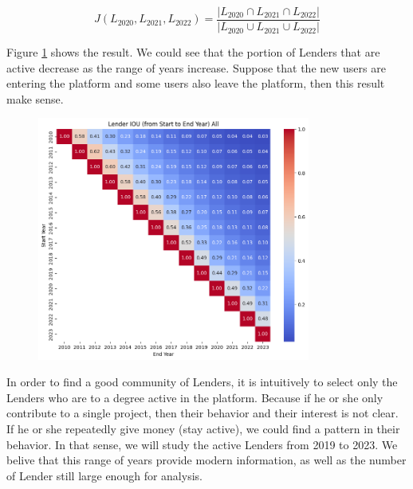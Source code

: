 \begin{equation}
	J(L_{2020}, L_{2021}, L_{2022}) = \frac{|L_{2020} \cap L_{2021} \cap L_{2022}|}{|L_{2020} \cup L_{2021} \cup L_{2022}|}
\end{equation}


Figure \ref{fig:active-fromto} shows the result.
We could see that the portion of Lenders that are active decrease as the range of years increase.
Suppose that the new users are entering the platform and some users also leave the platform,
then this result make sense.


\begin{figure}[H]
	\centering
	\includegraphics[width=0.8\textwidth]{images/active-fromto.png}
	\caption{}
	\label{fig:active-fromto}
\end{figure}

In order to find a good community of Lenders,
it is intuitively to select only the Lenders who are to a degree active in the platform.
Because if he or she only contribute to a single project,
then their behavior and their interest is not clear.
If he or she repeatedly give money (stay active),
we could find a pattern in their behavior.
In that sense, we will study the active Lenders from 2019 to 2023.
We belive that this range of years provide modern information,
as well as the number of Lender still large enough for analysis.
